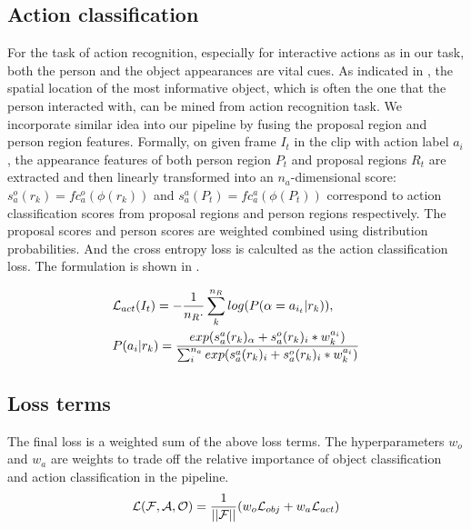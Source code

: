 \subsection{Action classification}
For the task of action recognition, especially for interactive actions as in our task, both the person and the object appearances are vital cues. As indicated in \cite{gkioxari2015contextual}, the spatial location of the most informative object, which is often the one that the person interacted with, can be mined from action recognition task. We incorporate similar idea into our pipeline by fusing the proposal region and person region features. Formally, on given frame $I_t$ in the clip with action label $a_i$, the appearance features of both person region $P_t$ and proposal regions $R_t$ are extracted and then linearly transformed into an $n_a$-dimensional score: $s_a^o(r_k) = fc_a^o(\phi(r_k))$ and $s_a^a(P_t) = fc_a^a(\phi(P_t))$ correspond to action classification scores from proposal regions and person regions respectively. The proposal scores and person scores are weighted combined using distribution probabilities. And the cross entropy loss is calculted as the action classification loss. The formulation is shown in .

\begin{align}
\label{eqn:act_cls_loss}
&{\mathcal L}_{act} (I_t) = -\frac{1}{n_R\cdot}\sum_{k}^{n_R} log(P(\alpha=a_{i_t}|r_k)), \nonumber\\
&P(a_i|r_k) = \frac{exp(s_a^a(r_k)_{\alpha}+s_a^o(r_k)_i*w_k^{a_i})}{\sum_{i}^{n_a}exp(s_a^a(r_k)_{i}+s_a^o(r_k)_{i}*w_k^{a_i})}
\end{align}

\subsection{Loss terms}
The final loss is a weighted sum of the above loss terms. The hyperparameters $w_o$ and $w_a$ are weights to trade off the relative importance of object classification and action classification in the pipeline.
\begin{align}
\label{eqn:final_loss_term}
{\mathcal L}({\mathcal F}, {\mathcal A}, {\mathcal O}) = \frac{1}{||{\mathcal F}||}(w_o{\mathcal L}_{obj}+w_a{\mathcal L}_{act})
\end{align}

